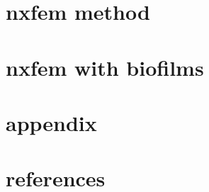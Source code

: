 \documentclass[12pt,twoside,table]{book}
\begin{document}


%




\part{nxfem method}
\label{part:nxfem}




\part{nxfem with biofilms}
\label{part:nxfem-biofilm}


\part*{appendix}

\appendix


%

\backmatter %

\endgroup %


\part*{references}

\listoffigures %

\listoftables %

\listofalgorithms
{}
\end{document}
